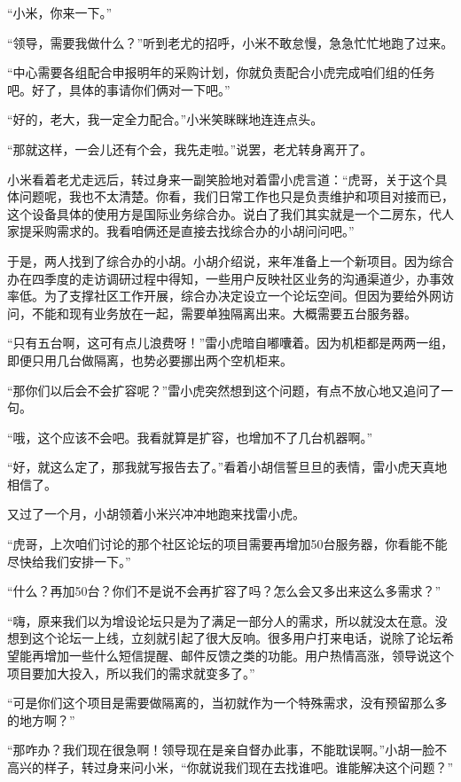 \documentclass[12pt,UTF8]{ctexbook}
\begin{document}
“小米，你来一下。”

“领导，需要我做什么？”听到老尤的招呼，小米不敢怠慢，急急忙忙地跑了过来。

“中心需要各组配合申报明年的采购计划，你就负责配合小虎完成咱们组的任务吧。好了，具体的事请你们俩对一下吧。”

“好的，老大，我一定全力配合。”小米笑眯眯地连连点头。

“那就这样，一会儿还有个会，我先走啦。”说罢，老尤转身离开了。

小米看着老尤走远后，转过身来一副笑脸地对着雷小虎言道：“虎哥，关于这个具体问题呢，我也不太清楚。你看，我们日常工作也只是负责维护和项目对接而已，这个设备具体的使用方是国际业务综合办。说白了我们其实就是一个二房东，代人家提采购需求的。我看咱俩还是直接去找综合办的小胡问问吧。”

于是，两人找到了综合办的小胡。小胡介绍说，来年准备上一个新项目。因为综合办在四季度的走访调研过程中得知，一些用户反映社区业务的沟通渠道少，办事效率低。为了支撑社区工作开展，综合办决定设立一个论坛空间。但因为要给外网访问，不能和现有业务放在一起，需要单独隔离出来。大概需要五台服务器。

“只有五台啊，这可有点儿浪费呀！”雷小虎暗自嘟囔着。因为机柜都是两两一组，即便只用几台做隔离，也势必要挪出两个空机柜来。

“那你们以后会不会扩容呢？”雷小虎突然想到这个问题，有点不放心地又追问了一句。

“哦，这个应该不会吧。我看就算是扩容，也增加不了几台机器啊。”

“好，就这么定了，那我就写报告去了。”看着小胡信誓旦旦的表情，雷小虎天真地相信了。

又过了一个月，小胡领着小米兴冲冲地跑来找雷小虎。

“虎哥，上次咱们讨论的那个社区论坛的项目需要再增加50台服务器，你看能不能尽快给我们安排一下。”

“什么？再加50台？你们不是说不会再扩容了吗？怎么会又多出来这么多需求？”

“嗨，原来我们以为增设论坛只是为了满足一部分人的需求，所以就没太在意。没想到这个论坛一上线，立刻就引起了很大反响。很多用户打来电话，说除了论坛希望能再增加一些什么短信提醒、邮件反馈之类的功能。用户热情高涨，领导说这个项目要加大投入，所以我们的需求就变多了。”

“可是你们这个项目是需要做隔离的，当初就作为一个特殊需求，没有预留那么多的地方啊？”

“那咋办？我们现在很急啊！领导现在是亲自督办此事，不能耽误啊。”小胡一脸不高兴的样子，转过身来问小米，“你就说我们现在去找谁吧。谁能解决这个问题？”
\end{document}
